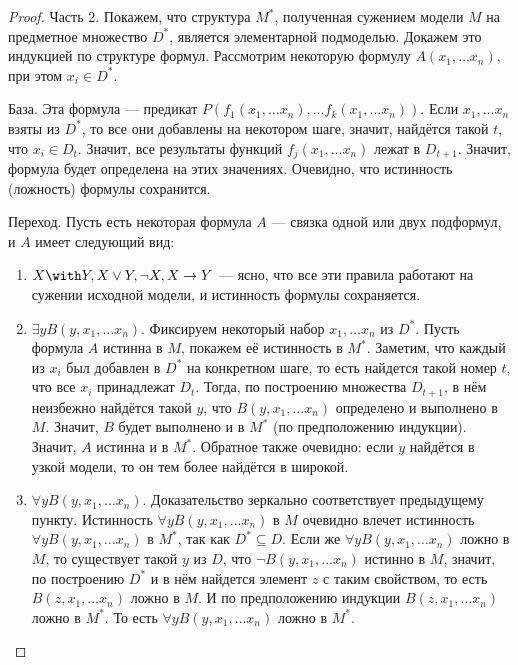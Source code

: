 \begin{proof}
Часть 2. Покажем, что структура $M^*$, полученная сужением модели $M$ на
предметное множество $D^*$, является элементарной подмоделью.
Докажем это индукцией по структуре формул. Рассмотрим некоторую формулу 
$A(x_1, \dots x_n)$, при этом $x_i \in D^*$.

База. Эта формула --- предикат $P (f_1 (x_1, \dots x_n), \dots f_k (x_1,
\dots x_n) )$. Если $x_1, \dots x_n$ взяты из $D^*$, то все они
добавлены на некотором шаге, значит, найдётся такой $t$, что $x_i \in D_t$.
Значит, все результаты функций $f_j (x_1, \dots x_n)$ лежат в $D_{t+1}$.
Значит, формула будет определена на этих значениях. Очевидно, что истинность
(ложность) формулы сохранится.

Переход. Пусть есть некоторая формула $A$ --- связка одной или двух 
подформул, и $A$ имеет следующий вид:

\begin{enumerate}
\item $X \with Y, X \vee Y, \neg X, X \rightarrow Y$ --- ясно, что
все эти правила работают на сужении исходной модели, и истинность
формулы сохраняется.

\item $\exists y B (y, x_1, \dots x_n)$. Фиксируем некоторый набор 
$x_1, \dots x_n$ из $D^*$.
Пусть формула $A$ истинна в $M$, покажем её истинность в $M^*$.
Заметим, что каждый из $x_i$ был добавлен в $D^*$ на конкретном шаге, 
то есть найдется такой номер $t$, что все $x_i$ принадлежат $D_t$. 
Тогда, по построению множества $D_{t+1}$, в нём неизбежно найдётся 
такой $y$, что $B (y, x_1, \dots x_n)$ определено и выполнено в $M$.
Значит, $B$ будет выполнено и в $M^*$ (по предположению индукции).
Значит, $A$ истинна и в $M^*$.
Обратное также очевидно: если $y$ найдётся в узкой модели, то он тем более
найдётся в широкой.

\item $\forall y B (y, x_1, \dots x_n)$. Доказательство зеркально
соответствует предыдущему пункту. 
Истинность $\forall y B(y,x_1, \dots x_n)$ в $M$ очевидно влечет
истинность $\forall y B(y,x_1, \dots x_n)$ в $M^*$, так как $D^* \subseteq D$. 
Если же $\forall y B(y,x_1, \dots x_n)$ ложно в $M$, то существует такой $y$ из $D$, 
что $\neg B(y,x_1,\dots x_n)$ истинно в $M$, значит, по построению $D^*$ и в
нём найдется элемент $z$ с таким свойством, то есть $B(z,x_1,\dots x_n)$ ложно
в $M$. И по предположению индукции $B(z,x_1, \dots x_n)$ ложно в $M^*$. То есть 
$\forall y B(y,x_1, \dots x_n)$ ложно в $M^*$.
\end{enumerate}

\end{proof}

